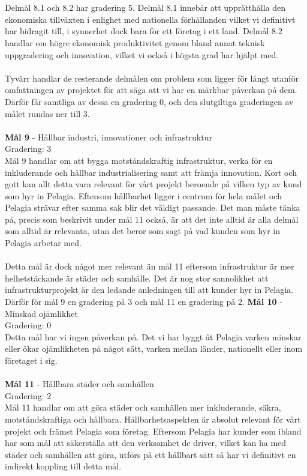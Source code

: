 \\
\\
Delmål 8.1 och 8.2 har gradering 5. Delmål 8.1 innebär att upprätthålla den ekonomiska tillväxten i enlighet med nationella förhållanden vilket vi definitivt har bidragit till, i synnerhet dock bara för ett företag i ett land. Delmål 8.2 handlar om högre ekonomisk produktivitet genom bland annat teknisk uppgradering och innovation, vilket vi också i högsta grad har hjälpt med.
\\
\\
Tyvärr handlar de resterande delmålen om problem som ligger för långt utanför omfattningen av projektet för att säga att vi har en märkbar påverkan på dem. Därför får samtliga av dessa en gradering 0, och den slutgiltiga graderingen av målet rundas ner till 3.
\\
\\
\textbf{Mål 9}
 - Hållbar industri, innovationer och infrastruktur
\\
Gradering: 3
\\
Mål 9 handlar om att bygga motståndskraftig infrastruktur, verka för en inkluderande och hållbar industrialisering samt att främja innovation. Kort och gott kan allt detta vara relevant för vårt projekt beroende på vilken typ av kund som hyr in Pelagia. Eftersom hållbarhet ligger i centrum för hela målet och Pelagia strävar efter samma sak blir det väldigt passande. Det man måste tänka på, precis som beskrivit under mål 11 också, är att det inte alltid är alla delmål som alltid är relevanta, utan det beror som sagt på vad kunden som hyr in Pelagia arbetar med.
\\
\\
Detta mål är dock något mer relevant än mål 11 eftersom infrastruktur är mer helhetstäckande är städer och samhälle. Det är nog stor sannolikhet att infrastrukturprojekt är den ledande anledningen till att kunder hyr in Pelagia. Därför för mål 9 en gradering på 3 och mål 11 en gradering på 2.
\textbf{Mål 10}
 - Minskad ojämlikhet
\\
Gradering: 0
\\
Detta mål har vi ingen påverkan på. Det vi har byggt åt Pelagia varken minskar eller ökar ojämlikheten på något sätt, varken mellan länder, nationellt eller inom företaget i sig.
\\
\\
\textbf{Mål 11}
 - Hållbara städer och samhällen
\\
Gradering: 2
\\
Mål 11 handlar om att göra städer och samhällen mer inkluderande, säkra, motståndskraftiga och hållbara. Hållbarhetsaspekten är absolut relevant för vårt projekt och främst Pelagia som företag. Eftersom Pelagia har kunder som ibland har som mål att säkerställa att den verksamhet de driver, vilket kan ha med städer och samhällen att göra, utförs på ett hållbart sätt så har vi definitivt en indirekt koppling till detta mål.
